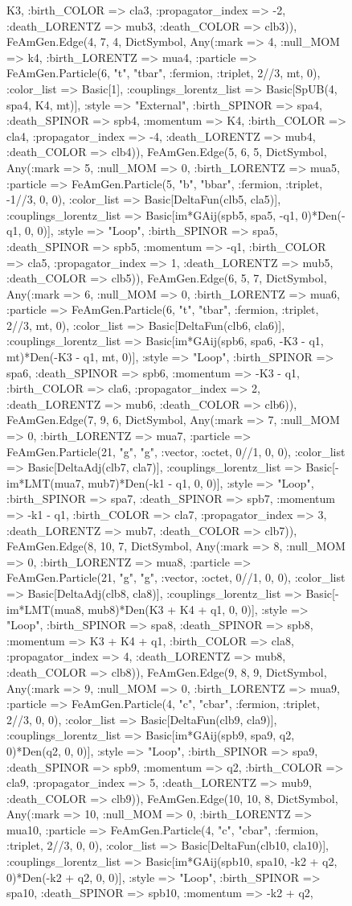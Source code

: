 \documentclass{revtex4}
\begin{document}
\begin{figure}[!htb]
\begin{center}
{K3, :birth_COLOR => cla3, :propagator_index => -2, :death_LORENTZ => mub3, :death_COLOR => clb3)), FeAmGen.Edge(4, 7, 4, Dict{Symbol, Any}(:mark => 4, :null_MOM => k4, :birth_LORENTZ => mua4, :particle => FeAmGen.Particle(6, "t", "tbar", :fermion, :triplet, 2//3, mt, 0), :color_list => Basic[1], :couplings_lorentz_list => Basic[SpUB(4, spa4, K4, mt)], :style => "External", :birth_SPINOR => spa4, :death_SPINOR => spb4, :momentum => K4, :birth_COLOR => cla4, :propagator_index => -4, :death_LORENTZ => mub4, :death_COLOR => clb4)), FeAmGen.Edge(5, 6, 5, Dict{Symbol, Any}(:mark => 5, :null_MOM => 0, :birth_LORENTZ => mua5, :particle => FeAmGen.Particle(5, "b", "bbar", :fermion, :triplet, -1//3, 0, 0), :color_list => Basic[DeltaFun(clb5, cla5)], :couplings_lorentz_list => Basic[im*GAij(spb5, spa5, -q1, 0)*Den(-q1, 0, 0)], :style => "Loop", :birth_SPINOR => spa5, :death_SPINOR => spb5, :momentum => -q1, :birth_COLOR => cla5, :propagator_index => 1, :death_LORENTZ => mub5, :death_COLOR => clb5)), FeAmGen.Edge(6, 5, 7, Dict{Symbol, Any}(:mark => 6, :null_MOM => 0, :birth_LORENTZ => mua6, :particle => FeAmGen.Particle(6, "t", "tbar", :fermion, :triplet, 2//3, mt, 0), :color_list => Basic[DeltaFun(clb6, cla6)], :couplings_lorentz_list => Basic[im*GAij(spb6, spa6, -K3 - q1, mt)*Den(-K3 - q1, mt, 0)], :style => "Loop", :birth_SPINOR => spa6, :death_SPINOR => spb6, :momentum => -K3 - q1, :birth_COLOR => cla6, :propagator_index => 2, :death_LORENTZ => mub6, :death_COLOR => clb6)), FeAmGen.Edge(7, 9, 6, Dict{Symbol, Any}(:mark => 7, :null_MOM => 0, :birth_LORENTZ => mua7, :particle => FeAmGen.Particle(21, "g", "g", :vector, :octet, 0//1, 0, 0), :color_list => Basic[DeltaAdj(clb7, cla7)], :couplings_lorentz_list => Basic[-im*LMT(mua7, mub7)*Den(-k1 - q1, 0, 0)], :style => "Loop", :birth_SPINOR => spa7, :death_SPINOR => spb7, :momentum => -k1 - q1, :birth_COLOR => cla7, :propagator_index => 3, :death_LORENTZ => mub7, :death_COLOR => clb7)), FeAmGen.Edge(8, 10, 7, Dict{Symbol, Any}(:mark => 8, :null_MOM => 0, :birth_LORENTZ => mua8, :particle => FeAmGen.Particle(21, "g", "g", :vector, :octet, 0//1, 0, 0), :color_list => Basic[DeltaAdj(clb8, cla8)], :couplings_lorentz_list => Basic[-im*LMT(mua8, mub8)*Den(K3 + K4 + q1, 0, 0)], :style => "Loop", :birth_SPINOR => spa8, :death_SPINOR => spb8, :momentum => K3 + K4 + q1, :birth_COLOR => cla8, :propagator_index => 4, :death_LORENTZ => mub8, :death_COLOR => clb8)), FeAmGen.Edge(9, 8, 9, Dict{Symbol, Any}(:mark => 9, :null_MOM => 0, :birth_LORENTZ => mua9, :particle => FeAmGen.Particle(4, "c", "cbar", :fermion, :triplet, 2//3, 0, 0), :color_list => Basic[DeltaFun(clb9, cla9)], :couplings_lorentz_list => Basic[im*GAij(spb9, spa9, q2, 0)*Den(q2, 0, 0)], :style => "Loop", :birth_SPINOR => spa9, :death_SPINOR => spb9, :momentum => q2, :birth_COLOR => cla9, :propagator_index => 5, :death_LORENTZ => mub9, :death_COLOR => clb9)), FeAmGen.Edge(10, 10, 8, Dict{Symbol, Any}(:mark => 10, :null_MOM => 0, :birth_LORENTZ => mua10, :particle => FeAmGen.Particle(4, "c", "cbar", :fermion, :triplet, 2//3, 0, 0), :color_list => Basic[DeltaFun(clb10, cla10)], :couplings_lorentz_list => Basic[im*GAij(spb10, spa10, -k2 + q2, 0)*Den(-k2 + q2, 0, 0)], :style => "Loop", :birth_SPINOR => spa10, :death_SPINOR => spb10, :momentum => -k2 + q2, }
\end{center}
\end{figure}
\end{document}
